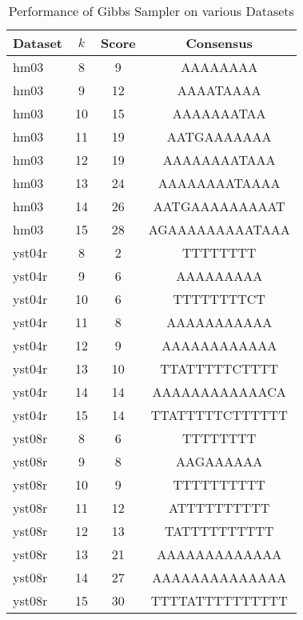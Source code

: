 \documentclass{report}
\begin{document}
\begin{table}[htbp]
\centering
\caption{Performance of Gibbs Sampler on various Datasets}
\label{tab:summary-results}
\begin{tabular}{@{}lccc@{}}
\toprule
\textbf{Dataset} & \textbf{\(k\)} & \textbf{Score} & \textbf{Consensus} \\ \midrule
hm03 & 8 & 9 & AAAAAAAA \\
hm03 & 9 & 12 & AAAATAAAA \\
hm03 & 10 & 15 & AAAAAAATAA \\
hm03 & 11 & 19 & AATGAAAAAAA \\
hm03 & 12 & 19 & AAAAAAAATAAA \\
hm03 & 13 & 24 & AAAAAAAATAAAA \\
hm03 & 14 & 26 & AATGAAAAAAAAAT \\
hm03 & 15 & 28 & AGAAAAAAAAATAAA \\
yst04r & 8 & 2 & TTTTTTTT \\
yst04r & 9 & 6 & AAAAAAAAA \\
yst04r & 10 & 6 & TTTTTTTTCT \\
yst04r & 11 & 8 & AAAAAAAAAAA \\
yst04r & 12 & 9 & AAAAAAAAAAAA \\
yst04r & 13 & 10 & TTATTTTTCTTTT \\
yst04r & 14 & 14 & AAAAAAAAAAAACA \\
yst04r & 15 & 14 & TTATTTTTCTTTTTT \\
yst08r & 8 & 6 & TTTTTTTT \\
yst08r & 9 & 8 & AAGAAAAAA \\
yst08r & 10 & 9 & TTTTTTTTTT \\
yst08r & 11 & 12 & ATTTTTTTTTT \\
yst08r & 12 & 13 & TATTTTTTTTTT \\
yst08r & 13 & 21 & AAAAAAAAAAAAA \\
yst08r & 14 & 27 & AAAAAAAAAAAAAA \\
yst08r & 15 & 30 & TTTTATTTTTTTTTT \\ 
\bottomrule
\end{tabular}
\end{table}
\end{document}
